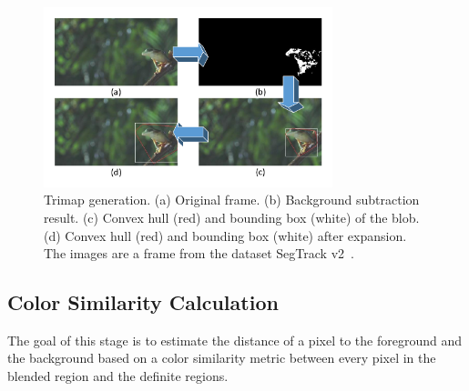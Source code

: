 \begin{figure}
	\centering
	\includegraphics[width=3.3in]{figures/trimap.pdf}
	\caption{Trimap generation. (a) Original frame. (b) Background subtraction result. (c) Convex hull (red) and bounding box (white) of the blob. (d) Convex hull (red) and bounding box (white) after expansion. The images are a frame from the dataset SegTrack v2~\cite{f-li2013}.}
	\label{fig-trimap}
\end{figure}

\subsection{Color Similarity Calculation}
\label{sec:vos:m:csc}

The goal of this stage is to estimate the distance of a pixel to the foreground and the background based on a color similarity metric between every pixel in the blended region and the definite regions.


